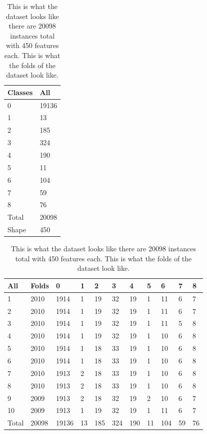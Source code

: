 \documentclass[ms]{nuthesis}
\begin{document}
\FloatBarrier
\begin{table}[!htb]
\centering
\begin{subtable}{.15\linewidth}
  \centering
  \begin{tabular}{|l||l|}\toprule
    Classes & All \\ \midrule
    0 & 19136 \\
    1 & 13 \\
    2 & 185 \\
    3 & 324 \\
    4 & 190 \\
    5 & 11 \\
    6 & 104 \\
    7 & 59 \\
    8 & 76 \\
    Total & 20098 \\
    Shape & 450 \\
 \bottomrule
  \end{tabular}
  \label{tab:ClassesAll}
  \caption{Classes}
\end{subtable}%
\begin{subtable}{.85\linewidth}
\centering
  \begin{tabular}{|l||l||l||l||l||l||l||l||l||l||l|}\toprule
    All & Folds & 0 & 1 & 2 & 3 & 4 & 5 & 6 & 7 & 8 \\ \midrule
    1 & 2010 & 1914 & 1 & 19 & 32 & 19 & 1 & 11 & 6 & 7 \\
    2 & 2010 & 1914 & 1 & 19 & 32 & 19 & 1 & 11 & 6 & 7 \\
    3 & 2010 & 1914 & 1 & 19 & 32 & 19 & 1 & 11 & 5 & 8 \\
    4 & 2010 & 1914 & 1 & 19 & 32 & 19 & 1 & 10 & 6 & 8 \\
    5 & 2010 & 1914 & 1 & 18 & 33 & 19 & 1 & 10 & 6 & 8 \\
    6 & 2010 & 1914 & 1 & 18 & 33 & 19 & 1 & 10 & 6 & 8 \\
    7 & 2010 & 1913 & 2 & 18 & 33 & 19 & 1 & 10 & 6 & 8 \\
    8 & 2010 & 1913 & 2 & 18 & 33 & 19 & 1 & 10 & 6 & 8 \\
    9 & 2009 & 1913 & 2 & 18 & 32 & 19 & 2 & 10 & 6 & 7 \\
    10 & 2009 & 1913 & 1 & 19 & 32 & 19 & 1 & 11 & 6 & 7 \\ \midrule
    Total & 20098 & 19136 & 13 & 185 & 324 & 190 & 11 & 104 & 59 & 76 \\
 \bottomrule
  \end{tabular}
  \label{tab:partitions}
  \caption{Folds}
  \end{subtable}
  \caption{This is what the dataset looks like there are 20098 instances total with 450 features each. This is what the folds of the dataset look like.}
\end{table}
\FloatBarrier
\end{document}
